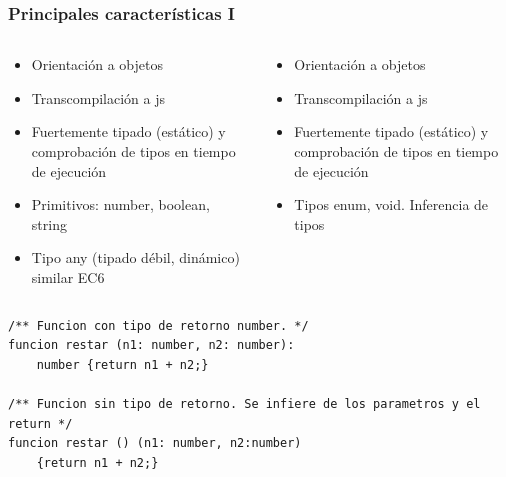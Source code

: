 \documentclass{beamer}
\begin{document}
\begin{frame}[fragile]
\frametitle{Principales características I}

\small
\begin{columns}[T]
	\begin{column}[T]{.5\textwidth} %
		
		\begin{itemize}
			\item Orientación a objetos
			\item Transcompilación a js 
			\item Fuertemente tipado (estático) y comprobación de tipos en tiempo de ejecución
			\item Primitivos: number, boolean, string
			\item Tipo any (tipado débil, dinámico) similar EC6
		\end{itemize}
		
		
	\end{column}
	\begin{column}[T]{0.5\textwidth} %
		\begin{itemize}
			\item Orientación a objetos
			\item Transcompilación a js 
			\item Fuertemente tipado (estático) y comprobación de tipos en tiempo de ejecución
			\item Tipos enum, void. Inferencia de tipos
		\end{itemize}

	\end{column}
\end{columns}

\tiny
 \begin{lstlisting}[style=customc, frame=single]
/** Funcion con tipo de retorno number. */
funcion restar (n1: number, n2: number): 
	number {return n1 + n2;}
	
/** Funcion sin tipo de retorno. Se infiere de los parametros y el return */
funcion restar () (n1: number, n2:number)
	{return n1 + n2;}
\end{lstlisting}


\end{frame}
\end{document}
